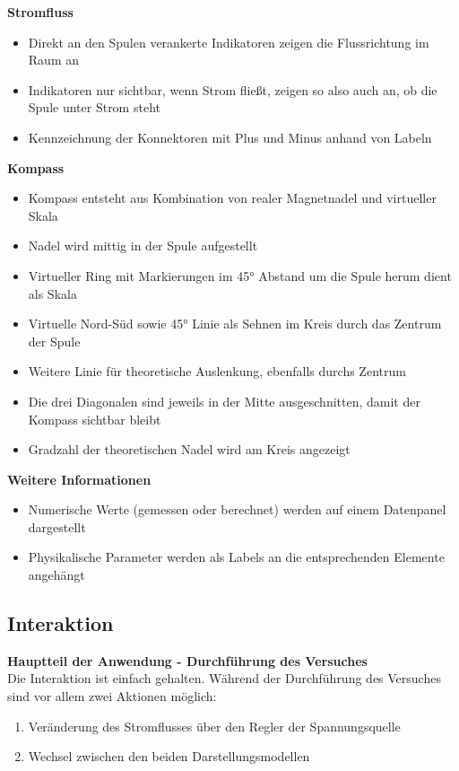 \textbf{Stromfluss}
\begin{itemize}[topsep=-2px]
	\setlength{\itemsep}{-5pt}
	\item Direkt an den Spulen verankerte Indikatoren zeigen die Flussrichtung im Raum an
	\item Indikatoren nur sichtbar, wenn Strom fließt, zeigen so also auch an, ob die Spule unter Strom steht
	\item Kennzeichnung der Konnektoren mit Plus und Minus anhand von Labeln
\end{itemize}
\vspace{8px}

\textbf{Kompass}
\begin{itemize}[topsep=-2px]
	\setlength{\itemsep}{-5pt}
	\item Kompass entsteht aus Kombination von realer Magnetnadel und virtueller Skala
	\item Nadel wird mittig in der Spule aufgestellt
	\item Virtueller Ring mit Markierungen im 45° Abstand um die Spule herum dient als Skala	
	\item Virtuelle Nord-Süd sowie 45° Linie als Sehnen im Kreis durch das Zentrum der Spule
	\item Weitere Linie für theoretische Auslenkung, ebenfalls durchs Zentrum
	\item Die drei Diagonalen sind jeweils in der Mitte ausgeschnitten, damit der Kompass sichtbar bleibt
	\item Gradzahl der theoretischen Nadel wird am Kreis angezeigt
\end{itemize}
\vspace{8px}

\textbf{Weitere Informationen}
\begin{itemize}[topsep=-2px]
	\setlength{\itemsep}{-5pt}
	\item Numerische Werte (gemessen oder berechnet) werden auf einem Datenpanel dargestellt
	\item Physikalische Parameter werden als Labels an die entsprechenden Elemente angehängt
\end{itemize}
\vspace{4px}

\subsection{Interaktion}
\textbf{Hauptteil der Anwendung - Durchführung des Versuches}\\
Die Interaktion ist einfach gehalten. Während der Durchführung des Versuches sind vor allem zwei Aktionen möglich:
\begin{enumerate}[topsep=-2px]
	\setlength{\itemsep}{-5pt}
	\item Veränderung des Stromflusses über den Regler der Spannungsquelle
	\item Wechsel zwischen den beiden Darstellungsmodellen
\end{enumerate}
\vspace{4px}

